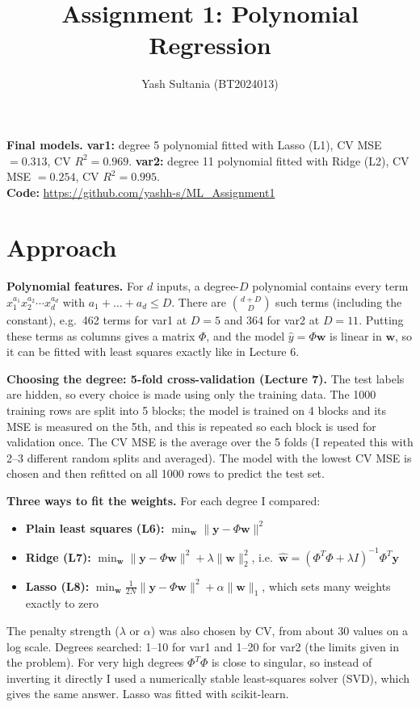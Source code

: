 \documentclass[11pt,a4paper]{article}
\title{\vspace{-1.2cm}\textbf{Assignment 1: Polynomial Regression}}
\author{Yash Sultania \quad (BT2024013)}
\date{}
\newcommand{\repo}{\url{https://github.com/yashh-s/ML_Assignment1}}
\begin{document}
\maketitle
\vspace{-1.0cm}

\textbf{Final models.}
\textbf{var1:} degree 5 polynomial fitted with Lasso (L1), CV MSE $=0.313$, CV $R^2=0.969$.
\textbf{var2:} degree 11 polynomial fitted with Ridge (L2), CV MSE $=0.254$, CV $R^2=0.995$.\\
\textbf{Code:} \repo

\section{Approach}

\textbf{Polynomial features.} For $d$ inputs, a degree-$D$ polynomial contains every term
$x_1^{a_1}x_2^{a_2}\cdots x_d^{a_d}$ with $a_1+\dots+a_d\le D$. There are $\binom{d+D}{D}$ such terms
(including the constant), e.g.\ 462 terms for var1 at $D=5$ and 364 for var2 at $D=11$.
Putting these terms as columns gives a matrix $\Phi$, and the model $\hat y=\Phi\mathbf w$ is linear in $\mathbf w$,
so it can be fitted with least squares exactly like in Lecture 6.

\textbf{Choosing the degree: 5-fold cross-validation (Lecture 7).}
The test labels are hidden, so every choice is made using only the training data. The 1000 training rows are split
into 5 blocks; the model is trained on 4 blocks and its MSE is measured on the 5th, and this is repeated so each block is used for
validation once. The CV MSE is the average over the 5 folds (I repeated this with 2--3 different random splits and averaged).
The model with the lowest CV MSE is chosen and then refitted on all 1000 rows to predict the test set.

\textbf{Three ways to fit the weights.} For each degree I compared:
\begin{itemize}
\item \textbf{Plain least squares (L6):} $\min_\mathbf{w}\|\mathbf{y}-\Phi\mathbf{w}\|^2$
\item \textbf{Ridge (L7):} $\min_\mathbf{w}\|\mathbf{y}-\Phi\mathbf{w}\|^2+\lambda\|\mathbf{w}\|_2^2$, \;i.e.\ $\hat{\mathbf{w}}=(\Phi^T\Phi+\lambda I)^{-1}\Phi^T\mathbf{y}$
\item \textbf{Lasso (L8):} $\min_\mathbf{w}\frac{1}{2N}\|\mathbf{y}-\Phi\mathbf{w}\|^2+\alpha\|\mathbf{w}\|_1$, \;which sets many weights exactly to zero
\end{itemize}
The penalty strength ($\lambda$ or $\alpha$) was also chosen by CV, from about 30 values on a log scale.
Degrees searched: 1--10 for var1 and 1--20 for var2 (the limits given in the problem).
For very high degrees $\Phi^T\Phi$ is close to singular, so instead of inverting it directly I used a numerically stable
least-squares solver (SVD), which gives the same answer. Lasso was fitted with scikit-learn.
\end{document}
